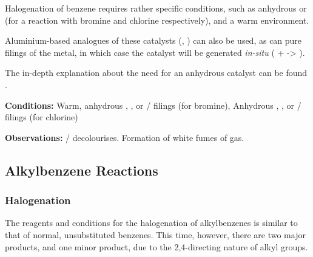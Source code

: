 			Halogenation of benzene requires rather specific conditions, such as anhydrous  or  (for a reaction
			with bromine and chlorine respectively), and a warm environment.

			Aluminium-based analogues of these catalysts (, ) can also be used, as can pure
			filings of the metal, in which case the catalyst will be generated \textit{in-situ} ( +  -> ).

			The in-depth explanation about the need for an anhydrous catalyst can be found \hyperlink{BenzeneHalogenationCatalyst}{}.

			\vspace{1.5em}
			\vbox{\textbf{Conditions:}	\tabto{35mm}Warm, anhydrous , , or  / \ch{\aluminium} filings (for bromine),
										\tabto{35mm}Anhydrous , , or
													 / \ch{\aluminium} filings (for chlorine)}

			\vspace{0.75em}
			\vbox{\textbf{Observations:}\tabto{35mm}  /   decolourises.
										\tabto{35mm}Formation of white fumes of  gas.}



		\pagebreak
		\subsection{Alkylbenzene Reactions}

			\subsubsection{Halogenation}
				The reagents and conditions for the halogenation of alkylbenzenes is similar to that of normal, unsubstituted benzenes. This
				time, however, there are two major products, and one minor product, due to the 2,4-directing nature of alkyl groups.

